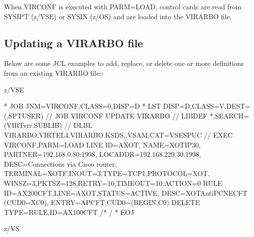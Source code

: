 \documentclass[letterpaper,10pt,english]{sphinxmanual}
\begin{document}

When VIRCONF is executed with PARM=LOAD, control cards are read from SYSIPT (z/VSE) or SYSIN (z/OS) and are loaded into the VIRARBO file.


\subsection{Updating a VIRARBO file}
\label{\detokenize{Installation_Guide:updating-a-virarbo-file}}
Below are some JCL examples to add, replace, or delete one or more definitions from an existing VIRARBO file:-

z/VSE

\begin{sphinxVerbatim}[commandchars=\\\{\}]
* \PYGZdl{}\PYGZdl{} JOB JNM=VIRCONF,CLASS=0,DISP=D
* \PYGZdl{}\PYGZdl{} LST DISP=D,CLASS=V,DEST=(,SPTUSER)
// JOB VIRCONF UPDATE VIRARBO
// LIBDEF *,SEARCH=(VIRTvrr.SUBLIB)
// DLBL VIRARBO,\PYGZsq{}VIRTEL4.VIRARBO.KSDS\PYGZsq{},,VSAM,CAT=VSESPUC
// EXEC VIRCONF,PARM=\PYGZsq{}LOAD\PYGZsq{}
        LINE  ID=A\PYGZhy{}XOT,
              NAME=XOT\PYGZhy{}IP30,
              PARTNER=192.168.0.80:1998,
              LOCADDR=192.168.229.30:1998,
              DESC=\PYGZsq{}Connections via Cisco router\PYGZsq{},
              TERMINAL=XOTF,INOUT=3,TYPE=TCP1,PROTOCOL=XOT,
              WINSZ=3,PKTSZ=128,RETRY=10,TIMEOUT=10,ACTION=0
        RULE ID=AX200CFT,LINE=A\PYGZhy{}XOT,STATUS=ACTIVE,
              DESC=\PYGZdq{}XOT\PYGZhy{}\PYGZgt{}AntiPCNE\PYGZhy{}\PYGZgt{}CFT (CUD0=X\PYGZsq{}C0\PYGZsq{})\PYGZdq{},
              ENTRY=APCFT,CUD0=(BEGIN,C0)
        DELETE TYPE=RULE,ID=AX100CFT
/*
/\PYGZam{}
* \PYGZdl{}\PYGZdl{} EOJ
\end{sphinxVerbatim}


z/VS
\end{document}

